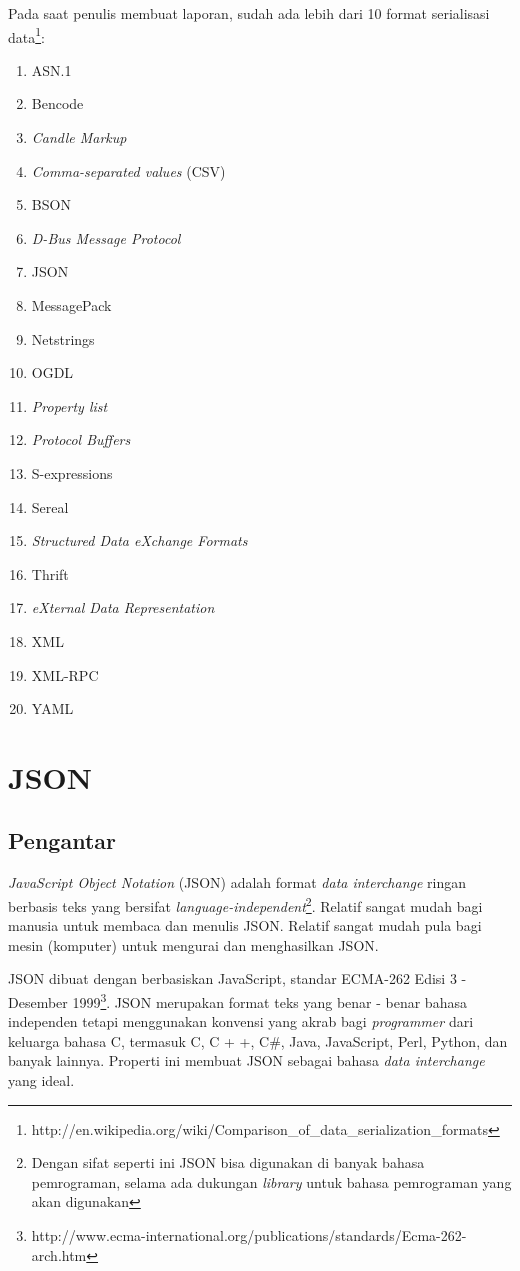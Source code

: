 \documentclass[a4paper, 12pt, oneside]{report}
\begin{document}
\onehalfspacing Pada saat penulis membuat laporan, sudah ada lebih dari 10 format serialisasi data\footnote{http://en.wikipedia.org/wiki/Comparison\_of\_data\_serialization\_formats}:
\begin{enumerate}
  \item ASN.1
  \item Bencode
  \item \textit{Candle Markup}
  \item \textit{Comma-separated values} (CSV)
  \item BSON
  \item \textit{D-Bus Message Protocol}
  \item JSON
  \item MessagePack
  \item Netstrings
  \item OGDL
  \item \textit{Property list}
  \item \textit{Protocol Buffers}
  \item S-expressions
  \item Sereal
  \item \textit{Structured Data eXchange Formats}
  \item Thrift
  \item \textit{eXternal Data Representation}
  \item XML
  \item XML-RPC
  \item YAML
\end{enumerate}

\section{JSON}

\subsection{Pengantar}
\onehalfspacing \textit{JavaScript Object Notation} (JSON) adalah format \textit{data interchange} ringan berbasis teks yang bersifat \textit{language-independent}\footnote{Dengan sifat seperti ini JSON bisa digunakan di banyak bahasa pemrograman, selama ada dukungan \textit{library} untuk bahasa pemrograman yang akan digunakan}. Relatif sangat mudah bagi manusia untuk membaca dan menulis JSON. Relatif sangat mudah pula bagi mesin (komputer) untuk mengurai dan menghasilkan JSON.

\onehalfspacing JSON dibuat dengan berbasiskan JavaScript, standar ECMA-262 Edisi 3 - Desember 1999\footnote{http://www.ecma-international.org/publications/standards/Ecma-262-arch.htm}. JSON merupakan format teks yang benar - benar bahasa independen tetapi menggunakan konvensi yang akrab bagi \textit{programmer} dari keluarga bahasa C, termasuk C, C + +, C\#, Java, JavaScript, Perl, Python, dan banyak lainnya. Properti ini membuat JSON sebagai bahasa \textit{data interchange} yang ideal\cite{introducing-json}.
\end{document}
